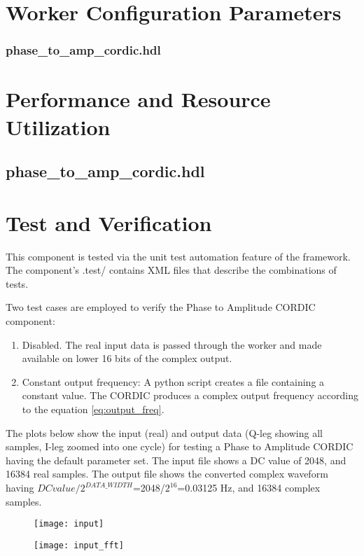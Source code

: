 \documentclass{article}
\def\comp{phase\_to\_amp\_cordic}
\edef\ecomp{phase_to_amp_cordic}
\begin{document}
\begin{landscape}
\section*{Worker Configuration Parameters}
\subsubsection*{\comp.hdl}

\section*{Performance and Resource Utilization}
\subsection*{\comp.hdl}

\end{landscape}
\newpage

\section*{Test and Verification}
This component is tested via the unit test automation feature of the framework.  The component's .test/ contains XML files that describe the combinations of tests.\medskip

Two test cases are employed to verify the Phase to Amplitude CORDIC component:

\begin{enumerate}
	\item Disabled. The real input data is passed through the worker and made available on lower 16 bits of the complex output.
	\item Constant output frequency: A python script creates a file containing a constant value. The CORDIC produces a complex output frequency according to the equation \ref{eq:output_freq}.
\end{enumerate}

The plots below show the input (real) and output data (Q-leg showing all samples, I-leg zoomed into one cycle) for testing a Phase to Amplitude CORDIC having the default parameter set. The input file shows a DC value of 2048, and 16384 real samples.  The output file shows the converted complex waveform having $DC value/2^{DATA\_WIDTH}$=2048/$2^{16}$=0.03125 Hz, and 16384 complex samples.

\begin{figure}[ht]
	\centering
	\begin{minipage}{.5\textwidth}
		\centering\texttt{[image: input]}
		\label{fig:input_tdomain}
	\end{minipage}%
	\begin{minipage}{.5\textwidth}
		\centering\texttt{[image: input\_fft]}
		\label{fig:input_fdomain}
	\end{minipage}
\end{figure}
\end{document}
